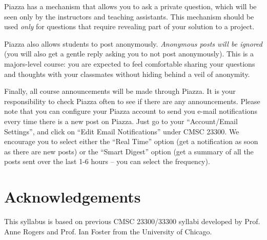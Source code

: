 \documentclass[11pt]{article}
\begin{document}
Piazza has a mechanism that allows you to ask a private question, which will be seen only by the instructors and teaching assistants. This mechanism should be used \emph{only} for questions that require revealing part of your solution to a project.

Piazza also allows students to post anonymously. \emph{Anonymous posts will be ignored} (you will also get a gentle reply asking you to not post anonymously). This is a majors-level course: you are expected to feel comfortable sharing your questions and thoughts with your classmates without hiding behind a veil of anonymity.

Finally, all course announcements will be made through Piazza. It is your responsibility to check Piazza often to see if there are any announcements. Please note that you can configure your Piazza account to send you e-mail notifications every time there is a new post on Piazza. Just go to your ``Account/Email Settings'', and click on ``Edit Email Notifications'' under CMSC 23300. We 
encourage you to select either the ``Real Time'' option (get a notification as soon as there are new posts) or the ``Smart Digest'' option (get a summary of all the posts sent over the last 1-6 hours -- you can select the frequency).


\section{Acknowledgements}

This syllabus is based on previous CMSC 23300/33300 syllabi developed by Prof. Anne Rogers and Prof. Ian Foster from the University of Chicago.
\end{document}
